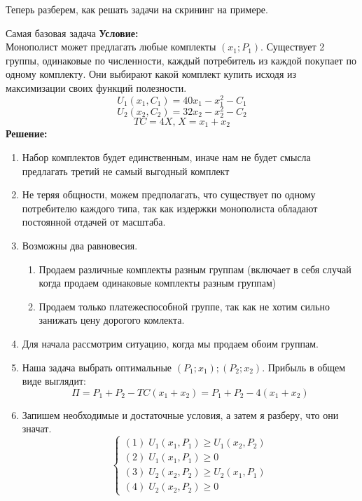 Теперь разберем, как решать задачи на скрининг на примере.\smallskip

\begin{mybox}{Самая базовая задача}
    \textbf{Условие:}\\ Монополист может предлагать любые комплекты $(x_1;P_1)$. Существует 2 группы, одинаковые по
    численности, каждый потребитель из каждой покупает по одному комплекту. Они выбирают какой комплект купить исходя из
    максимизации своих функций полезности. \\
    $$U_1(x_1,C_1)=40x_1-x_1^2-C_1$$
    $$U_2(x_2,C_2)=32x_2-x_2^2-C_2$$
    $$TC=4X\text{,}\;X=x_1+x_2$$
    \tcblower
    \textbf{Решение:}
    \begin{enumerate}
        \item Набор комплектов будет единственным, иначе нам не будет смысла предлагать третий не самый выгодный
        комплект
        \item Не теряя общности, можем предполагать, что существует по одному потребителю каждого типа, так как издержки
        монополиста обладают постоянной отдачей от масштаба.
        \item Возможны два равновесия. \begin{enumerate}
            \item Продаем различные комплекты разным группам (включает в себя случай когда продаем одинаковые комплекты
            разным группам)
            \item Продаем только платежеспособной группе, так как не хотим сильно занижать цену дорогого комлекта.
        \end{enumerate}
        \item Для начала рассмотрим ситуацию, когда мы продаем обоим группам.
        \item Наша задача выбрать оптимальные $(P_1;x_1);(P_2;x_2)$. Прибыль в общем виде выглядит:
        $$\Pi=P_1+P_2-TC(x_1+x_2)=P_1+P_2-4(x_1+x_2)$$
        \item Запишем необходимые и достаточные условия, а затем я разберу, что они значат.
        \begin{equation*}
         \begin{cases}
           (1)\;U_1(x_1,P_1)\geq U_1(x_2,P_2)
           \\
           (2)\;U_1(x_1,P_1)\geq 0
           \\
           (3)\;U_2(x_2,P_2)\geq U_2(x_1,P_1)
           \\
           (4)\;U_2(x_2,P_2)\geq 0
         \end{cases}

\end{equation*}
\end{enumerate}
\end{mybox}
